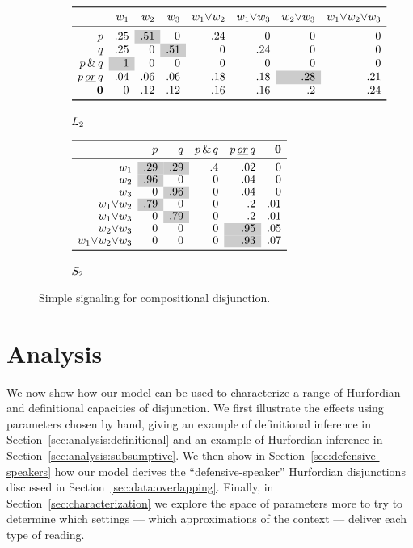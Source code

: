 \documentclass[12pt,twoside]{article}
\renewcommand{\_}{\textbf{\textunderscore\hspace{-4pt}\textunderscore\hspace{-3pt}\textunderscore\hspace{-4pt}\textunderscore}\hspace{0.5pt}}			%
\begin{document}
\begin{figure}[tp]
  \centering
  \begin{subfigure}{1\textwidth}
    \centering
    $\closurelex
    {.25 & \graycell{.51} & 0 & .24 & 0 & 0 & 0}
    {\graycell{1} & 0 & 0 & 0 & 0 & 0 & 0}
    {.25 & 0 & \graycell{.51} & 0 & .24 & 0 & 0}
    {.04 & .06 & .06 & .18 & .18 & \graycell{.28} & .21}
    {0 & .12 & .12 & .16 & .16 & .2 & .24}$
    \caption{$\ListenerK[2]$}
  \end{subfigure}

  \begin{subfigure}{1\textwidth}
    \centering
    $\begin{array}[c]{ *{6}{r} }
       \toprule
       & p & q & \pandq & \porq & \nullmsg \\
       \midrule
       w_{1} & \graycell{.29} & \graycell{.29} & .4 & .02 & 0 \\
       w_{2} & \graycell{.96} & 0   & 0  & .04 & 0 \\
       w_{3} & 0   & \graycell{.96} & 0  & .04 & 0 \\
       w_{1}{\vee}w_{2} & \graycell{.79} & 0   & 0  & .2  & .01 \\
       w_{1}{\vee}w_{3} & 0   & \graycell{.79} & 0 & .2  & .01 \\
       w_{2}{\vee}w_{3} & 0   & 0   & 0 & \graycell{.95} & .05 \\
       w_{1}{\vee}w_{2}{\vee}w_{3} & 0   & 0   & 0 & \graycell{.93} & .07 \\
       \bottomrule
     \end{array}$
     \caption{$\SpeakerK[2]$}
   \end{subfigure}
   \caption{Simple signaling for compositional disjunction.}
  \label{fig:compdisj}
\end{figure}




\section{Analysis}\label{sec:analysis}

We now show how our model can be used to characterize a range of
Hurfordian and definitional capacities of disjunction. We first
illustrate the effects using parameters chosen by hand, giving an
example of definitional inference in
Section~\ref{sec:analysis:definitional} and an example of Hurfordian
inference in Section~\ref{sec:analysis:subsumptive}.  We then show in
Section~\ref{sec:defensive-speakers} how our model derives the
``defensive-speaker'' Hurfordian disjunctions discussed in
Section~\ref{sec:data:overlapping}.  Finally, in
Section~\ref{sec:characterization} we explore the space of parameters
more to try to determine which settings --- which approximations of
the context --- deliver each type of reading.
\end{document}
